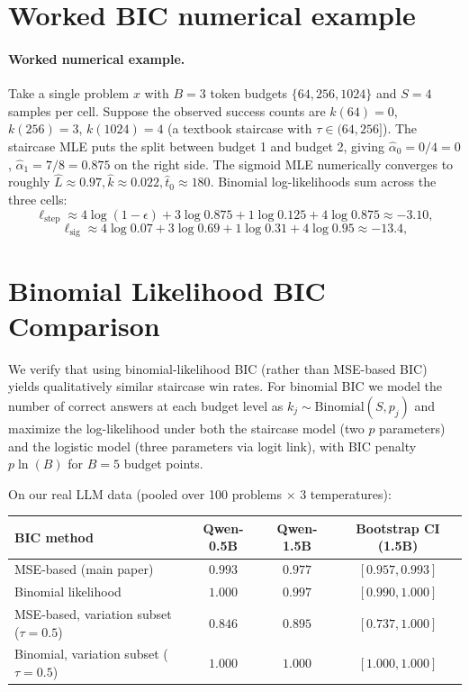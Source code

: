 \documentclass{article}
\begin{document}
\section{Worked BIC numerical example}
\label{app:worked}
\paragraph{Worked numerical example.}  Take a single problem $x$ with $B{=}3$ token budgets $\{64, 256, 1024\}$ and $S{=}4$ samples per cell.  Suppose the observed success counts are $k(64)=0$, $k(256)=3$, $k(1024)=4$ (a textbook staircase with $\tau \in (64, 256]$).  The staircase MLE puts the split between budget 1 and budget 2, giving $\hat\alpha_0 = 0/4 = 0$, $\hat\alpha_1 = 7/8 = 0.875$ on the right side.  The sigmoid MLE numerically converges to roughly $\hat L \approx 0.97, \hat k \approx 0.022, \hat t_0 \approx 180$.  Binomial log-likelihoods sum across the three cells:
\[
\ell_{\text{step}} \approx 4 \log(1{-}\epsilon) + 3 \log 0.875 + 1 \log 0.125 + 4 \log 0.875 \approx -3.10,
\]
\[
\ell_{\text{sig}} \approx 4 \log 0.07 + 3 \log 0.69 + 1 \log 0.31 + 4 \log 0.95 \approx -13.4,
\]
\section{Binomial Likelihood BIC Comparison}
\label{app:binomial}

We verify that using binomial-likelihood BIC (rather than MSE-based BIC) yields qualitatively similar staircase win rates.  For binomial BIC we model the number of correct answers at each budget level as $k_j \sim \text{Binomial}(S, p_j)$ and maximize the log-likelihood under both the staircase model (two $p$ parameters) and the logistic model (three parameters via logit link), with BIC penalty $p \ln(B)$ for $B{=}5$ budget points.

On our real LLM data (pooled over 100 problems $\times$ 3 temperatures):

\begin{center}
\small
\begin{tabular}{lccc}
\toprule
\textbf{BIC method} & \textbf{Qwen-0.5B} & \textbf{Qwen-1.5B} & \textbf{Bootstrap CI (1.5B)} \\
\midrule
MSE-based (main paper)                    & $0.993$ & $0.977$ & $[0.957, 0.993]$ \\
Binomial likelihood                       & $1.000$ & $0.997$ & $[0.990, 1.000]$ \\
\midrule
MSE-based, variation subset ($\tau{=}0.5$) & $0.846$ & $0.895$ & $[0.737, 1.000]$ \\
Binomial, variation subset ($\tau{=}0.5$)  & $1.000$ & $1.000$ & $[1.000, 1.000]$ \\
\bottomrule
\end{tabular}
\end{center}
\end{document}
